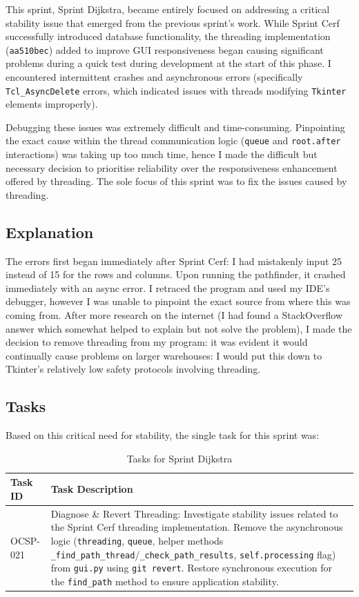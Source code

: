 This sprint, Sprint Dijkstra, became entirely focused on addressing a critical stability issue that emerged from the previous sprint's work. While Sprint Cerf successfully introduced database functionality, the threading implementation (\verb|aa510bec|) added to improve GUI responsiveness began causing significant problems during a quick test during development at the start of this phase. I encountered intermittent crashes and asynchronous errors (specifically \verb|Tcl_AsyncDelete| errors, which indicated issues with threads modifying \verb|Tkinter| elements improperly).

Debugging these issues was extremely difficult and time-consuming. Pinpointing the exact cause within the thread communication logic (\verb|queue| and \verb|root.after| interactions) was taking up too much time, hence I made the difficult but necessary decision to prioritise reliability over the responsiveness enhancement offered by threading. The sole focus of this sprint was to fix the issues caused by threading.

\subsection{Explanation}

The errors first began immediately after Sprint Cerf: I had mistakenly input 25 instead of 15 for the rows and columns. Upon running the pathfinder, it crashed immediately with an async error. I retraced the program and used my IDE's debugger, however I was unable to pinpoint the exact source from where this was coming from. After more research on the internet (I had found a StackOverflow answer which somewhat helped to explain but not solve the problem), I made the decision to remove threading from my program: it was evident it would continually cause problems on larger warehouses: I would put this down to Tkinter's relatively low safety protocols involving threading.

\subsection{Tasks}

Based on this critical need for stability, the single task for this sprint was:
\begin{table}[htbp]
	\centering
	\begin{tabularx}{\textwidth}{|l|X|}
		\hline
		\textbf{Task ID} & \textbf{Task Description} \\
		\hline
		OCSP-021 & Diagnose \& Revert Threading: Investigate stability issues related to the Sprint Cerf threading implementation. Remove the asynchronous logic (\verb|threading|, \verb|queue|, helper methods \verb|_find_path_thread|/\verb|_check_path_results|, \verb|self.processing| flag) from \verb|gui.py| using \verb|git revert|. Restore synchronous execution for the \verb|find_path| method to ensure application stability. \\
		\hline
	\end{tabularx}
	\caption{Tasks for Sprint Dijkstra}
\end{table}


